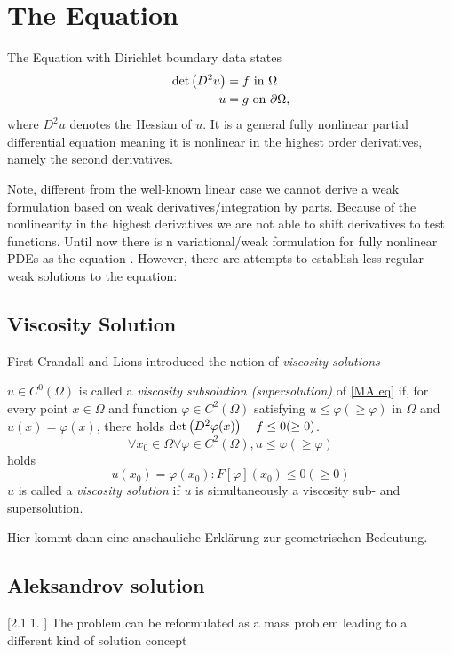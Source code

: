 \section{The \MA Equation}

The \MA Equation with Dirichlet boundary data states
\begin{align}
	 \det{\left(D^2 u\right)} &= f \textnormal{ in } \Omega \label{MA eq}\\
	 u & = g \textnormal{ on } \partial \Omega,
\end{align}
where $D^2 u$ denotes the Hessian of $u$.
It is a general fully nonlinear partial differential equation meaning it is nonlinear in the highest order derivatives, namely the second derivatives.

Note, different from the well-known linear case we cannot derive a weak formulation based on weak derivatives/integration by parts. Because of the nonlinearity in the highest derivatives we are not able to shift derivatives to test functions. Until now there is n  variational/weak formulation for fully nonlinear PDEs as the \MA equation \cite{FGN2013}.
However, there are attempts to establish less regular weak solutions to the \MA equation:

\subsection{Viscosity Solution}
First Crandall and Lions \cite{58} introduced the notion of \emph{viscosity solutions}

\begin{definition}
	$u \in C^0(\Omega)$ is called a \emph{viscosity subsolution (supersolution)} of \eqref{MA eq} if, for every point $x \in \Omega$ and function $\varphi \in C^2(\Omega)$ satisfying $u \leq \varphi (\geq \varphi)$ in $\Omega$ and $u(x) = \varphi(x)$, there holds $\det{\left(D^2 \varphi(x)\right)} - f \leq 0 (\geq 0)$. 
	\[
	\forall x_0 \in \Omega \forall \varphi \in C^2(\Omega), u \leq \varphi (\geq \varphi)
	\] holds
	\[
	u(x_0) = \varphi(x_0) : F[\varphi](x_0) \leq 0 (\geq 0)
	\]
	$u$ is called a \emph{viscosity solution} if $u$ is simultaneously a viscosity sub- and supersolution.
\end{definition}

Hier kommt dann eine anschauliche Erklärung zur geometrischen Bedeutung.

\subsection{Aleksandrov solution}[2.1.1. \cite{Feng2013}]
The \MA problem can be reformulated as a mass problem leading to a different kind of solution concept

